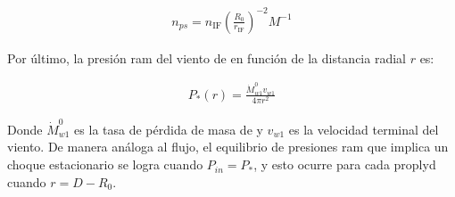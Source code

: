 \begin{align}
  n_{ps} = n_{\mathrm{IF}}\left(\frac{R_0}{r_{\mathrm{IF}}}\right)^{-2} M^{-1} \label{eq:density-scale}
\end{align}


Por último, la presión ram del viento de \thC{} en función de la distancia radial $r$ es:

\begin{align}
  P_*(r) = \frac{\dot{M}^{0}_{w1}v_{w1}}{4\pi r^2} \label{eq:P-star}
\end{align}

 Donde $\dot{M}^{0}_{w1}$ es la tasa de pérdida de masa de \thC{} y $v_{w1}$ es la velocidad terminal del viento. De manera análoga al flujo, el equilibrio de presiones ram que implica un choque estacionario se logra cuando $P_{in} = P_*$, y esto ocurre para cada proplyd cuando $r = D-R_0$. %


